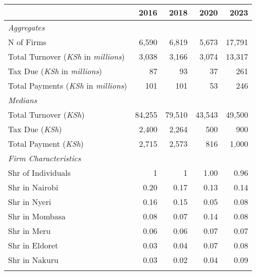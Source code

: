 \begin{tabular}{lrrrr}
\toprule
 & 2016 & 2018 & 2020 & 2023\\
\midrule
\textit{Aggregates} &  &  &  & \\
N of Firms & 6,590 & 6,819 & 5,673 & 17,791\\
Total Turnover (\textit{KSh} in \textit{millions}) & 3,038 & 3,166 & 3,074 & 13,317\\
Tax Due (\textit{KSh} in \textit{millions}) & 87 & 93 & 37 & 261\\
Total Payments (\textit{KSh} in \textit{millions}) & 101 & 101 & 53 & 246\\
\cmidrule(lr){3-6}
\textit{Medians} &  &  &  & \\
Total Turnover (\textit{KSh}) & 84,255 & 79,510 & 43,543 & 49,500\\
Tax Due (\textit{KSh}) & 2,400 & 2,264 & 500 & 900\\
Total Payment (\textit{KSh}) & 2,715 & 2,573 & 816 & 1,000\\
\cmidrule(lr){3-6}
\textit{Firm Characteristics} &  &  &  & \\
Shr of Individuals & 1 & 1 & 1.00 & 0.96\\
Shr in Nairobi & 0.20 & 0.17 & 0.13 & 0.14\\
Shr in Nyeri & 0.16 & 0.15 & 0.05 & 0.08\\
Shr in Mombasa & 0.08 & 0.07 & 0.14 & 0.08\\
Shr in Meru & 0.06 & 0.06 & 0.07 & 0.07\\
Shr in Eldoret & 0.03 & 0.04 & 0.07 & 0.08\\
Shr in Nakuru & 0.03 & 0.02 & 0.04 & 0.09\\
\cmidrule(lr){3-6}\\
\bottomrule
\end{tabular}
